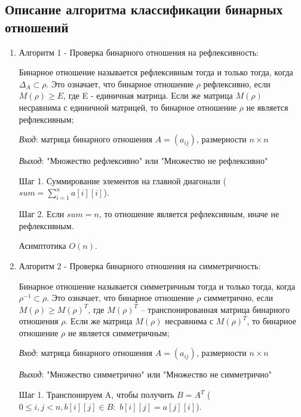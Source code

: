 \documentclass[spec, och, labwork]{shiza}
\begin{document}
        \subsection{Описание алгоритма классификации бинарных отношений}
            \begin{enumerate}

                \item Алгоритм 1 - Проверка бинарного отношения на рефлексивность:
                
                Бинарное отношение называется рефлексивным тогда и только тогда, когда $\Delta_A \subset \rho$. Это 
                означает, что бинарное отношение $\rho$ рефлексивно, если $M(\rho) \geq E$, где E - единичная матрица. 
                Если же матрица $M(\rho)$ несравнима с единичной матрицей, то бинарное отношение $\rho$ не является рефлексивным;

                \textit{Вход}: матрица бинарного отношения $A = (a_{ij})$, размерности $n \times n$

                \textit{Выход}: "Множество рефлексивно" или "Множество не рефлексивно"

                Шаг 1. Суммирование элементов на главной диагонали ($sum = \sum\limits_{i=1}^n a[i][i]$). 
                
                Шаг 2. Если $sum = n$, то отношение является рефлексивным, иначе не рефлексивным.

                Асимптотика $O(n)$.

                \item Алгоритм 2 - Проверка бинарного отношения на симметричность:
                
                Бинарное отношение называется симметричным тогда и только тогда, когда $\rho^{-1} \subset \rho$. Это означает, что бинарное 
                отношение $\rho$ симметрично, если $M(\rho) \geq M(\rho)^T$, где $M(\rho)^T$ – транспонированная матрица 
                бинарного отношения $\rho$. Если же матрица $M(\rho)$ несравнима с $M(\rho)^T$, то бинарное отношение $\rho$
                не является симметричным;
                
                \textit{Вход}: матрица бинарного отношения $A = (a_{ij})$, размерности $n \times n$

                \textit{Выход}: "Множество симметрично" или "Множество не симметрично"

                Шаг 1. Транспонируем A, чтобы получить $B = A^T$ ($0 \leq i, j < n, b[i][j] \in B:$ $b[i][j] = a[j][i]$).


\end{enumerate}
\end{document}
